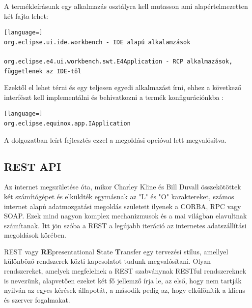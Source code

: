 A termékleírásunk egy alkalmazás osztályra kell mutasson ami alapértelmezetten két fajta lehet:

\begin{lstlisting}[language=]
org.eclipse.ui.ide.workbench - IDE alapú alkalamzások

org.eclipse.e4.ui.workbench.swt.E4Application - RCP alkalmazások, függetlenek az IDE-től
\end{lstlisting}

Ezektől el lehet térni és egy teljesen egyedi alkalmazást írni, ehhez a következő interfészt kell implementálni és behivatkozni a termék konfigurációnkba :

\begin{lstlisting}[language=]
org.eclipse.equinox.app.IApplication
\end{lstlisting}

A dolgozatban leírt fejlesztés ezzel a megoldási opcióval lett megvalósítva.

\subsection{REST API}

Az internet megszületése óta, mikor Charley Kline és Bill Duvall összekötöttek két számítógépet és elküldték egymásnak az "L" és "O" karaktereket, számos internet alapú adatmozgatási megoldás született ilyenek a CORBA, RPC vagy SOAP. Ezek mind nagyon komplex mechanizmusok és a mai világban elavultnak számítanak. Itt jön szóba a REST a legújabb iteráció az internetes adatszállítási megoldások körében.

REST vagy \textbf{RE}presentational \textbf{S}tate \textbf{T}ransfer egy tervezési stílus, amellyel különböző rendszerek közti kapcsolatot tudunk megvalósítani. Olyan rendszereket, amelyek megfelelnek a REST szabványnak RESTful rendszereknek is nevezünk, alapvetően ezeket két fő jellemző írja le, az első, hogy nem tartják nyilván az egyes kérések állapotát, a második pedig az, hogy elkülönítik a kliens és szerver fogalmakat. 

